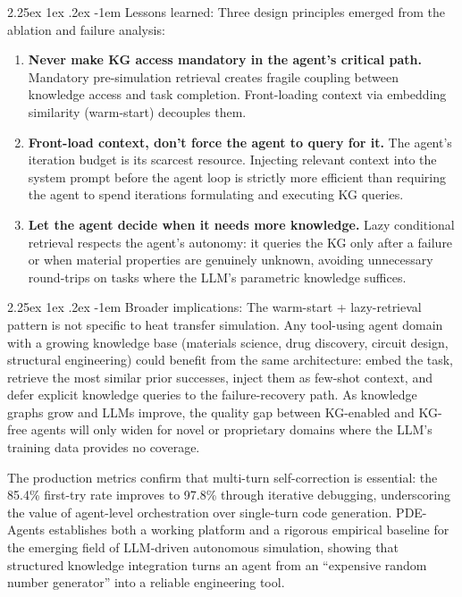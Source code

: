 \documentclass[preprint,review,12pt]{elsarticle}
\makeatletter
\renewcommand\paragraph{\@startsection{paragraph}{4}{\z@}%
  {2.25ex \@plus1ex \@minus.2ex}%
  {-1em}%
  {\normalfont\normalsize\bfseries}}
\newif\ifrevisionsvisible
\newcommand{\revised}[1]{%
  \ifrevisionsvisible\textcolor{revisionred}{#1}\else#1\fi}
\makeatother
\begin{document}
\paragraph{Lessons learned:}
Three design principles emerged from the ablation and failure analysis:
\begin{enumerate}
  \item \textbf{Never make KG access mandatory in the agent's critical path.}
        Mandatory pre-simulation retrieval creates fragile coupling between
        knowledge access and task completion.  Front-loading context via
        embedding similarity (warm-start) decouples them.
  \item \textbf{Front-load context, don't force the agent to query for it.}
        The agent's iteration budget is its scarcest resource.  Injecting
        relevant context into the system prompt before the agent loop is
        strictly more efficient than requiring the agent to spend iterations
        formulating and executing KG queries.
  \item \textbf{Let the agent decide when it needs more knowledge.}
        Lazy conditional retrieval respects the agent's autonomy: it queries
        the KG only after a failure or when material properties are genuinely
        unknown, avoiding unnecessary round-trips on tasks where the LLM's
        parametric knowledge suffices.
\end{enumerate}

\paragraph{Broader implications:}
The warm-start + lazy-retrieval pattern is not specific to heat transfer
simulation.  Any tool-using agent domain with a growing knowledge base
(materials science, drug discovery, circuit design, structural
engineering) could benefit from the same architecture: embed the task,
retrieve the most similar prior successes, inject them as few-shot
context, and defer explicit knowledge queries to the failure-recovery
path.  As knowledge graphs grow and LLMs improve, the quality gap
between KG-enabled and KG-free agents will only widen for novel or
proprietary domains where the LLM's training data provides no coverage.

The production metrics confirm that multi-turn self-correction is
essential: the \revised{85.4\%} first-try rate improves to 97.8\% through
iterative debugging, underscoring the value of agent-level orchestration
over single-turn code generation.  PDE-Agents establishes both a working
platform and a rigorous empirical baseline for the emerging field of
LLM-driven autonomous simulation, showing that structured knowledge
integration turns an agent from an ``expensive random number
generator'' into a reliable engineering tool.
\end{document}
